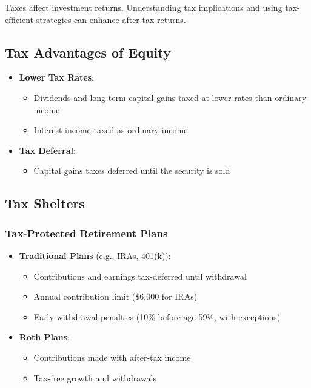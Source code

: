\documentclass[
]{book}
\providecommand{\tightlist}{%
  \setlength{\itemsep}{0pt}\setlength{\parskip}{0pt}}
\begin{document}
Taxes affect investment returns. Understanding tax implications and
using tax-efficient strategies can enhance after-tax returns.

\hypertarget{tax-advantages-of-equity}{%
\subsection{Tax Advantages of Equity}\label{tax-advantages-of-equity}}

\begin{itemize}
\tightlist
\item
  \textbf{Lower Tax Rates}:

  \begin{itemize}
  \tightlist
  \item
    Dividends and long-term capital gains taxed at lower rates than
    ordinary income
  \item
    Interest income taxed as ordinary income
  \end{itemize}
\item
  \textbf{Tax Deferral}:

  \begin{itemize}
  \tightlist
  \item
    Capital gains taxes deferred until the security is sold
  \end{itemize}
\end{itemize}

\hypertarget{tax-shelters}{%
\subsection{Tax Shelters}\label{tax-shelters}}

\hypertarget{tax-protected-retirement-plans}{%
\subsubsection{Tax-Protected Retirement
Plans}\label{tax-protected-retirement-plans}}

\begin{itemize}
\tightlist
\item
  \textbf{Traditional Plans} (e.g., IRAs, 401(k)):

  \begin{itemize}
  \tightlist
  \item
    Contributions and earnings tax-deferred until withdrawal
  \item
    Annual contribution limit (\$6,000 for IRAs)
  \item
    Early withdrawal penalties (10\% before age 59½, with exceptions)
  \end{itemize}
\item
  \textbf{Roth Plans}:

  \begin{itemize}
  \tightlist
  \item
    Contributions made with after-tax income
  \item
    Tax-free growth and withdrawals
  \end{itemize}
\end{itemize}
\end{document}
